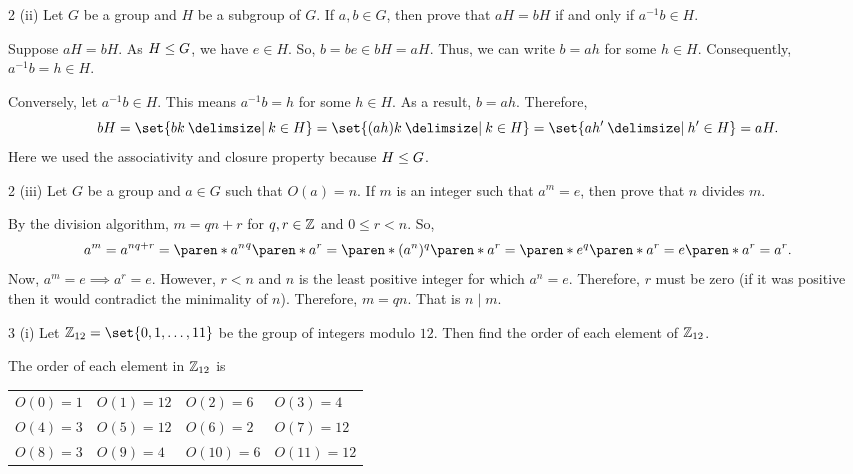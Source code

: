 \documentclass[11pt]{penrose}
\begin{document}
\begin{problem}{2 (ii)}
    Let $G$ be a group and $H$ be a subgroup of $G$. If $a, b \in G$, then prove that $aH = bH$ if and only if $a^{-1} b \in H$.

    \solution Suppose $aH = bH$. As $H \mathrel{\leq} G$, we have $e \in H$. So, $b = be \in bH = aH$. Thus, we can write $b = ah$ for some $h \in H$. Consequently, $a^{-1} b = h \in H$.

    Conversely, let $a^{-1} b \in H$. This means $a^{-1} b = h$ for some $h \in H$. As a result, $b = ah$. Therefore,
    \begin{equation*}
        bH = \set{bk \st k \in H} = \set{(ah)k \st k \in H} = \set{ah' \st h' \in H} = aH.
    \end{equation*}
    Here we used the associativity and closure property because $H \mathrel{\leq} G$.
\end{problem}

\begin{problem}{2 (iii)}
    Let $G$ be a group and $a \in G$ such that $O(a) = n$. If $m$ is an integer such that $a^m = e$, then prove that $n$ divides $m$.

    \solution By the division algorithm, $m = qn + r$ for $q, r \in \mathbb{Z}$ and $0 \leq r < n$. So,
    \begin{equation*}
        a^m = a^{nq + r} = \paren*{{a^n}^q} \paren*{a^r} = \paren*{({a^n})^q} \paren*{a^r} = \paren*{e^q} \paren*{a^r} = e \paren*{a^r} = a^r.
    \end{equation*}
    Now, $a^m = e \implies a^r = e$. However, $r < n$ and $n$ is the least positive integer for which $a^n = e$. Therefore, $r$ must be zero (if it was positive then it would contradict the minimality of $n$). Therefore, $m = qn$. That is $n \mid m$.
\end{problem}

\begin{problem}{3 (i)}
    Let $\Z_{12} = \set{0, 1, \dots, 11}$ be the group of integers modulo $12$. Then find the order of each element of $\mathbb{Z}_{12}$.

    \solution The order of each element in $\mathbb{Z}_{12}$ is
    \begin{center}
    \begin{tabularx}{0.8\textwidth}{XXXX}
        $O(0)  =  1$ & $O(1)  = 12$ & $O(2)  =  6$ & $O(3)  =  4$\\
        $O(4)  =  3$ & $O(5)  = 12$ & $O(6)  =  2$ & $O(7)  = 12$\\
        $O(8)  =  3$ & $O(9)  =  4$ & $O(10) =  6$ & $O(11) = 12$\\
    \end{tabularx}
    \end{center}
\end{problem}
\end{document}
